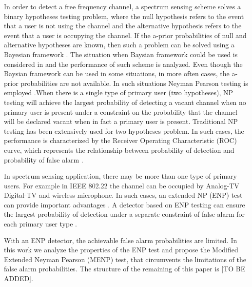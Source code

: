 \documentclass{report}
\begin{document}
\begin{spacing}{2.0}
In order to detect a free frequency channel, a spectrum sensing scheme solves a binary hypotheses testing problem, where the null hypothesis refers to the event that a user is not using the channel and the alternative hypothesis refers to the event that a user is occupying the channel. If the a-prior probabilities of null and alternative hypotheses are known, then such a problem can be solved using a Bayesian framework \cite{poor1994introduction}. The situation when Baysian framework could be used is considered in \cite{zeng2010review} and the performance of such scheme is analyzed.
Even though the Baysian framework can be used in some situations, in more often cases, the a-prior probabilities are not available. In such situations Neyman Pearson testing is employed \cite{poor1994introduction}.When there is a single type of primary user (two hypotheses), NP testing will achieve the largest probability of detecting a vacant channel when no primary user is present under a constraint on the probability that the channel will be declared vacant when in fact a primary user is present.
Traditional NP testing has been extensively used for two hypotheses problem. In such cases,  the performance is characterized by the Receiver Operating Characteristic (ROC) curve, which represents the relationship between probability of detection and probability of false alarm \cite{poor1994introduction}.

In spectrum sensing application, there may be more than one type of primary users. For example in IEEE 802.22 \cite{shellhammer2008spectrum} the channel can be occupied by Analog-TV Digital-TV and wireless microphone. In such cases, an extended NP (ENP) test can provide important advantages \cite{zhang1999design}. A detector based on ENP testing can ensure the largest probability of detection under a separate constraint of false alarm for each primary user type \cite{LehmannTest}.

With an ENP detector, the achievable false alarm probabilities are limited. In this work we analyze the properties of the ENP test and propose the Modified Extended Neyman Pearson (MENP) test, that circumvents the limitations of the false alarm probabilities. The structure of the remaining of this paper is [TO BE ADDED].

\newpage
\end{spacing}
\end{document}
